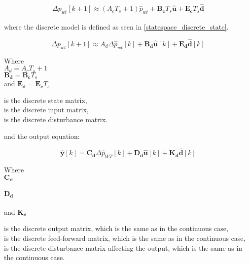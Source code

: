 \begin{equation}
  \begin{split}
  \Delta p_{wt}[k+1] \approx (A_cT_s+1)\hat{p}_{wt}+\bm{B_c}T_s \bm{\hat{u}}+\bm{E_c} T_s \bm{\hat{d}}
  \end{split}
  \label{eq:dist_statespace_forward_euler}
\end{equation}

where the discrete model is defined as seen in \eqref{statespace_discrete_state}.

\begin{equation}
\Delta p_{wt}[k+1] \approx A_d \Delta \hat{p}_{wt}[k]  + \bm{B_d} \bm{\hat{u}}[k] + \bm{E_d} \bm{\hat{d}}[k] 
 \label{statespace_discrete_state}
\end{equation}

\begin{minipage}[h]{0.25\textwidth}
Where\\
\hspace*{8mm} $A_d = A_cT_s+1 $\\
\hspace*{8mm} $\bm{B_d} = \bm{B_c}T_s$\\
and \hspace*{0.7mm} $\bm{E_d} = \bm{E_c}T_s$
\end{minipage}
\begin{minipage}[h]{0.73\textwidth}
\vspace*{2.5  mm}
is the discrete state matrix, \\
is the discrete input matrix, \\
is the discrete disturbance matrix. 
\end{minipage}


and the output equation:

\begin{equation}
  \bm{\hat{y}}[k] = \bm{C_d} \Delta \hat{p}_{WT}[k] + \bm{D_d} \bm{\hat{u}}[k] + \bm{K_d} \bm{\hat{d}}[k]
\label{statespace_control_output_discrete}
\end{equation}

\begin{minipage}[t]{0.20\textwidth}
Where\\
\hspace*{8mm} $\bm{C_d}$ \\\\
\hspace*{8mm} $\bm{D_d}$ \\\\
and \hspace*{0.7mm} $\bm{K_d}$ 
\end{minipage}
\begin{minipage}[t]{0.78\textwidth}
\vspace*{2mm}
is the discrete output matrix, which is the same as in the continuous case, \\
is the discrete feed-forward matrix, which is the same as in the continuous case, \\
is the discrete disturbance matrix affecting the output, which is the same as in the continuous case. \\
\end{minipage}



